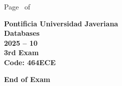 \documentclass[11pt, addpoints, answers]{exam}\usepackage[utf8]{inputenc}
\begin{document}
\begin{coverpages}
\begin{center}
			\vspace{3mm}
			\leavevmode \hspace{5mm} 
		\end{center}
	\end{coverpages}

	\footer{} {Page \thepage\ of \numpages} {}

	\centering
	\textbf{\Large Pontificia Universidad Javeriana}\\
	\textbf{\Large Databases} \\
	\textbf{\large 2025 -- 10} \\
	\textbf{\large 3rd Exam} \\
	\textbf{Code: 464ECE}


	\begin{questions}
		
		
		
		
		
		
		
		
		
		
		
		
		
		
		
		
		
		
		
		
	\end{questions}

	\vspace{5mm}
	\noindent \textbf{End of Exam}
\end{document}
